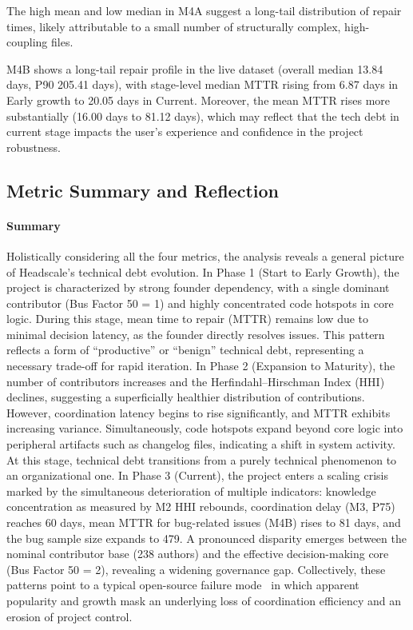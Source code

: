 \documentclass[11pt, a4paper]{article}
\begin{document}
The high mean and low median in M4A suggest a long-tail distribution of repair times, likely attributable to a small number of structurally complex, high-coupling files.

M4B shows a long-tail repair profile in the live dataset (overall median 13.84 days, P90 205.41 days), with stage-level median MTTR rising from 6.87 days in Early growth to 20.05 days in Current. Moreover, the mean MTTR rises more substantially (16.00 days to 81.12 days), which may reflect that the tech debt in current stage impacts the user's experience and confidence in the project robustness. 

\subsection{Metric Summary and Reflection}

\paragraph{Summary}
Holistically considering all the four metrics, the analysis reveals a general picture of Headscale's technical debt evolution. In Phase 1 (Start to Early Growth), the project is characterized by strong founder dependency, with a single dominant contributor (Bus Factor 50 = 1) and highly concentrated code hotspots in core logic. During this stage, mean time to repair (MTTR) remains low due to minimal decision latency, as the founder directly resolves issues. This pattern reflects a form of “productive” or “benign” technical debt, representing a necessary trade-off for rapid iteration. In Phase 2 (Expansion to Maturity), the number of contributors increases and the Herfindahl–Hirschman Index (HHI) declines, suggesting a superficially healthier distribution of contributions. However, coordination latency begins to rise significantly, and MTTR exhibits increasing variance. Simultaneously, code hotspots expand beyond core logic into peripheral artifacts such as changelog files, indicating a shift in system activity. At this stage, technical debt transitions from a purely technical phenomenon to an organizational one. In Phase 3 (Current), the project enters a scaling crisis marked by the simultaneous deterioration of multiple indicators: knowledge concentration as measured by M2 HHI rebounds, coordination delay (M3, P75) reaches 60 days, mean MTTR for bug-related issues (M4B) rises to 81 days, and the bug sample size expands to 479. A pronounced disparity emerges between the nominal contributor base (238 authors) and the effective decision-making core (Bus Factor 50 = 2), revealing a widening governance gap. Collectively, these patterns point to a typical open-source failure mode~\cite{coelho_why_2017} in which apparent popularity and growth mask an underlying loss of coordination efficiency and an erosion of project control.
\end{document}
